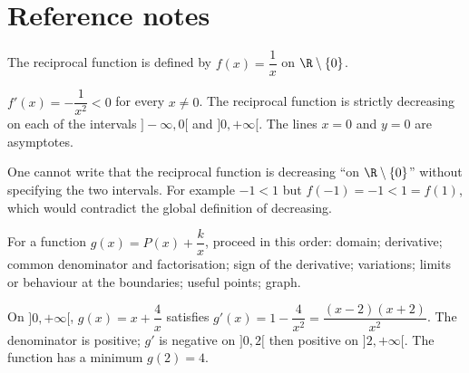 
\section{Reference notes}
The reciprocal function is defined by $f(x)=\dfrac1x$ on $\R\setminus\{0\}$.

\begin{center}
\end{center}

\begin{keypoint}
$f'(x)=-\dfrac1{x^2}<0$ for every $x\neq0$. The reciprocal function is strictly decreasing on each of the intervals $]-\infty,0[$ and $]0,+\infty[$. The lines $x=0$ and $y=0$ are asymptotes.
\end{keypoint}

\begin{pitfall}
One cannot write that the reciprocal function is decreasing ``on $\R\setminus\{0\}$'' without specifying the two intervals. For example $-1<1$ but $f(-1)=-1<1=f(1)$, which would contradict the global definition of decreasing.
\end{pitfall}

For a function $g(x)=P(x)+\dfrac{k}{x}$, proceed in this order: domain; derivative; common denominator and factorisation; sign of the derivative; variations; limits or behaviour at the boundaries; useful points; graph.

\begin{example}
On $]0,+\infty[$, $g(x)=x+\dfrac4x$ satisfies $g'(x)=1-\dfrac4{x^2}=\dfrac{(x-2)(x+2)}{x^2}$. The denominator is positive; $g'$ is negative on $]0,2[$ then positive on $]2,+\infty[$. The function has a minimum $g(2)=4$.
\end{example}

